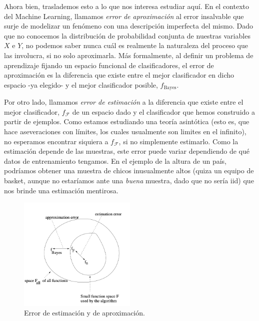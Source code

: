 \documentclass{report}
\begin{document}
Ahora bien, traslademos esto a lo que nos interesa estudiar aquí. En el contexto del Machine Learning, llamamos \textit{error de aproximación}
al error insalvable que surje de modelizar un fenómeno con una descripción imperfecta del mismo. Dado que no conocemos la distribución
de probabilidad conjunta de nuestras variables $X$ e $Y$, no podemos saber nunca cuál es realmente la naturaleza del proceso que las involucra,
si no solo aproximarla. Más formalmente, al definir un problema de aprendizaje fijando un espacio funcional de clasificadores, 
el error de aproximación es la diferencia que existe entre el mejor clasificador en dicho espacio -ya elegido- y el mejor clasificador posible,
$f_{\text{Bayes}}$.

Por otro lado, llamamos \textit{error de estimación} a la diferencia que existe entre el mejor clasificador, $f_{\mathcal{F}}$ de un espacio dado y el clasificador
que hemos construido a partir de ejemplos. Como estamos estudiando una teoría asintótica (esto es, que hace aseveraciones con límites, los cuales usualmente
son limites en el infinito), no esperamos encontrar siquiera a $f_{\mathcal{F}}$, si no simplemente estimarlo. Como la estimación depende de las muestras,
este error puede variar dependiendo de qué datos de entrenamiento tengamos. En el ejemplo de la altura de un país, podríamos obtener una muestra de chicos inusualmente
altos (quiza un equipo de basket, aunque no estaríamos ante una \textit{buena} muestra, dado que no sería iid) que nos brinde una estimación mentirosa. \newline

\begin{figure}[ht!]
    \centering
    \includegraphics[width=0.5\textwidth]{Images/2.png}
    \caption{Error de estimación y de aproximación.}
    \label{fig:error de estimación y aproximación}
\end{figure}
\end{document}
